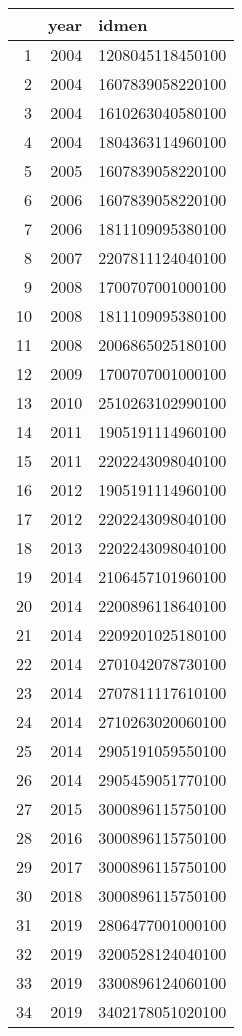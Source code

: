 \begin{table}[ht]
\centering
\begin{tabular}{rrl}
  \hline
 & year & idmen \\ 
  \hline
1 & 2004 & 1208045118450100 \\ 
  2 & 2004 & 1607839058220100 \\ 
  3 & 2004 & 1610263040580100 \\ 
  4 & 2004 & 1804363114960100 \\ 
  5 & 2005 & 1607839058220100 \\ 
  6 & 2006 & 1607839058220100 \\ 
  7 & 2006 & 1811109095380100 \\ 
  8 & 2007 & 2207811124040100 \\ 
  9 & 2008 & 1700707001000100 \\ 
  10 & 2008 & 1811109095380100 \\ 
  11 & 2008 & 2006865025180100 \\ 
  12 & 2009 & 1700707001000100 \\ 
  13 & 2010 & 2510263102990100 \\ 
  14 & 2011 & 1905191114960100 \\ 
  15 & 2011 & 2202243098040100 \\ 
  16 & 2012 & 1905191114960100 \\ 
  17 & 2012 & 2202243098040100 \\ 
  18 & 2013 & 2202243098040100 \\ 
  19 & 2014 & 2106457101960100 \\ 
  20 & 2014 & 2200896118640100 \\ 
  21 & 2014 & 2209201025180100 \\ 
  22 & 2014 & 2701042078730100 \\ 
  23 & 2014 & 2707811117610100 \\ 
  24 & 2014 & 2710263020060100 \\ 
  25 & 2014 & 2905191059550100 \\ 
  26 & 2014 & 2905459051770100 \\ 
  27 & 2015 & 3000896115750100 \\ 
  28 & 2016 & 3000896115750100 \\ 
  29 & 2017 & 3000896115750100 \\ 
  30 & 2018 & 3000896115750100 \\ 
  31 & 2019 & 2806477001000100 \\ 
  32 & 2019 & 3200528124040100 \\ 
  33 & 2019 & 3300896124060100 \\ 
  34 & 2019 & 3402178051020100 \\ 
   \hline
\end{tabular}
\end{table}
